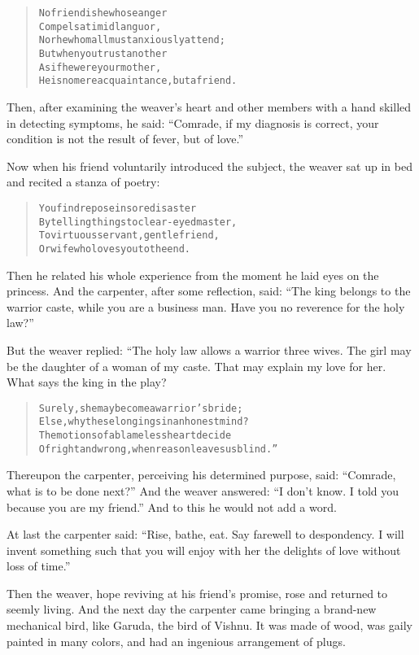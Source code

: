 \documentclass[article, twoside, 14pt]{memoir}
\renewenvironment{verbatim}{%
\begin{quote}%
\vskip -10pt%
\begin{alltt}\normalfont\large}{\end{alltt}%
\end{quote}%
\vskip -10pt
} %
\begin{document}
\begin{verbatim}
No friend is he whose anger
Compels a timid languor,
    Nor he whom all must anxiously attend;
But when you trust another
As if he were your mother,
    He is no mere acquaintance, but a friend.
\end{verbatim}
Then, after examining the weaver's heart and other members with a
hand skilled in detecting symptoms, he said:
``Comrade, if my diagnosis is correct, your condition is not the result of fever, but of love.''

Now when his friend voluntarily introduced the subject, the weaver
sat up in bed and recited a stanza of poetry:

\begin{verbatim}
You find repose in sore disaster
By telling things to clear-eyed master,
To virtuous servant, gentle friend,
Or wife who loves you to the end.
\end{verbatim}
Then he related his whole experience from the moment he laid eyes
on the princess. And the carpenter, after some reflection, said:
``The king belongs to the warrior caste, while you are a business man. Have you no reverence for the holy law?''

But the weaver replied: “The holy law allows a warrior three wives.
The girl may be the daughter of a woman of my caste. That may
explain my love for her. What says the king in the play?

\begin{verbatim}
Surely, she may become a warrior's bride;
    Else, why these longings in an honest mind?
The motions of a blameless heart decide
    Of right and wrong, when reason leaves us blind.”
\end{verbatim}
Thereupon the carpenter, perceiving his determined purpose, said:
``Comrade, what is to be done next?'' And the weaver answered:
``I don't know. I told you because you are my friend.'' And to this
he would not add a word.

At last the carpenter said:
``Rise, bathe, eat. Say farewell to despondency. I will invent something such that you will enjoy with her the delights of love without loss of time.''

Then the weaver, hope reviving at his friend's promise, rose
and returned to seemly living. And the next day the carpenter came
bringing a brand-new mechanical bird, like Garuda, the bird of
Vishnu. It was made of wood, was gaily painted in many colors, and
had an ingenious arrangement of plugs.
\end{document}
